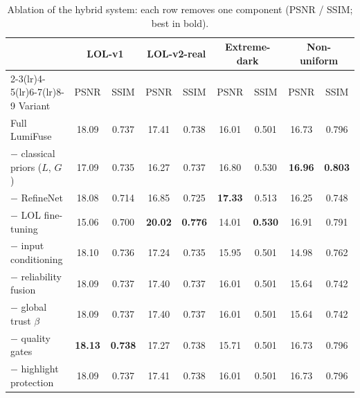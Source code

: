 \begin{table}[t]
\centering
\caption{Ablation of the hybrid system: each row removes one component (PSNR / SSIM; best in bold).}
\label{tab:ablation}
\setlength{\tabcolsep}{6pt}
\begin{tabular}{l cc cc cc cc}
\toprule
 & \multicolumn{2}{c}{LOL-v1} & \multicolumn{2}{c}{LOL-v2-real} & \multicolumn{2}{c}{Extreme-dark} & \multicolumn{2}{c}{Non-uniform} \\
\cmidrule(lr){2-3}\cmidrule(lr){4-5}\cmidrule(lr){6-7}\cmidrule(lr){8-9}
Variant & PSNR & SSIM & PSNR & SSIM & PSNR & SSIM & PSNR & SSIM \\
\midrule
Full LumiFuse & 18.09 & 0.737 & 17.41 & 0.738 & 16.01 & 0.501 & 16.73 & 0.796 \\
$-$ classical priors ($L$, $G$) & 17.09 & 0.735 & 16.27 & 0.737 & 16.80 & 0.530 & \textbf{16.96} & \textbf{0.803} \\
$-$ RefineNet & 18.08 & 0.714 & 16.85 & 0.725 & \textbf{17.33} & 0.513 & 16.25 & 0.748 \\
$-$ LOL fine-tuning & 15.06 & 0.700 & \textbf{20.02} & \textbf{0.776} & 14.01 & \textbf{0.530} & 16.91 & 0.791 \\
$-$ input conditioning & 18.10 & 0.736 & 17.24 & 0.735 & 15.95 & 0.501 & 14.98 & 0.762 \\
$-$ reliability fusion & 18.09 & 0.737 & 17.40 & 0.737 & 16.01 & 0.501 & 15.64 & 0.742 \\
$-$ global trust $\beta$ & 18.09 & 0.737 & 17.40 & 0.737 & 16.01 & 0.501 & 15.64 & 0.742 \\
$-$ quality gates & \textbf{18.13} & \textbf{0.738} & 17.27 & 0.738 & 15.71 & 0.501 & 16.73 & 0.796 \\
$-$ highlight protection & 18.09 & 0.737 & 17.41 & 0.738 & 16.01 & 0.501 & 16.73 & 0.796 \\
\bottomrule
\end{tabular}
\end{table}
